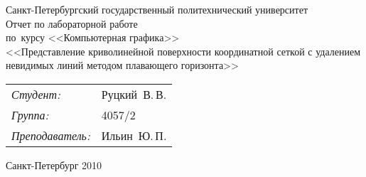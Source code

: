 
\begin{titlepage} %

\begin{center} %

\large Санкт-Петербургский государственный политехнический университет\\[4.5cm]

\huge Отчет по лабораторной работе \\[0.6cm] %
\large по~курсу <<Компьютерная графика>>\\[1cm]
\large <<Представление криволинейной поверхности координатной сеткой 
с удалением невидимых линий методом плавающего горизонта>>\\[3.7cm]

\begin{flushright} %
\begin{tabular}{l l}
\emph{Студент:} & Руцкий~В.\,В.\\
\emph{Группа:} & 4057/2\\
\emph{Преподаватель:} & Ильин~Ю.\,П.
\end{tabular}
\end{flushright} %

\vfill %

{\large Санкт-Петербург 2010}
\end{center} %
\thispagestyle{empty} %
\end{titlepage} %
